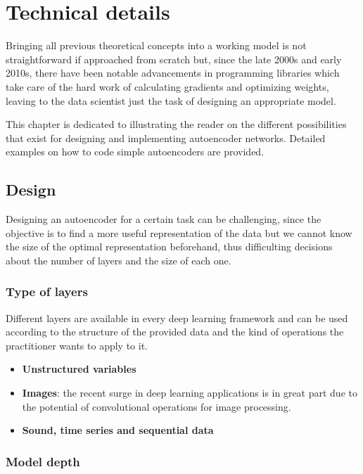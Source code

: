 \setchapterpreamble[u]{\margintoc}
\chapter{Technical details}

Bringing all previous theoretical concepts into a working model is not straightforward if approached from scratch but, since the late 2000s and early 2010s, there have been notable advancements in programming libraries which take care of the hard work of calculating gradients and optimizing weights, leaving to the data scientist just the task of designing an appropriate model.

This chapter is dedicated to illustrating the reader on the different possibilities that exist for designing and implementing autoencoder networks. Detailed examples on how to code simple autoencoders are provided.

\section{Design}

Designing an autoencoder for a certain task can be challenging, since the objective is to find a more useful representation of the data but we cannot know the size of the optimal representation beforehand, thus difficulting decisions about the number of layers and the size of each one.

\subsection{Type of layers}

Different layers are available in every deep learning framework and can be used according to the structure of the provided data and the kind of operations the practitioner wants to apply to it.

\begin{itemize}
    \item \textbf{Unstructured variables}
    \item \textbf{Images}: the recent surge in deep learning applications is in great part due to the potential of convolutional operations for image processing. 
    \item \textbf{Sound, time series and sequential data}
\end{itemize}

\subsection{Model depth}

